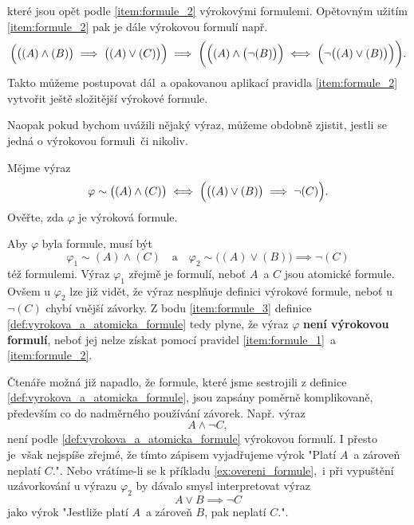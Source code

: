 které jsou opět podle \ref{item:formule_2} výrokovými formulemi. Opětovným užitím \ref{item:formule_2} pak je dále výrokovou formulí např.
\begin{equation*}
    \Bigl(\bigl((A) \land (B)\bigr) \implies \bigl((A) \lor (C)\bigr)\Bigr) \implies \bigg(\Bigl((A) \land \bigl(\neg(B)\bigr)\Bigr) \iff \Bigl(\neg\bigl((A) \lor (B)\bigr)\Bigr)\bigg).
\end{equation*}
Takto můžeme postupovat dál~a opakovanou aplikací pravidla \ref{item:formule_2} vytvořit ještě složitější výrokové formule.\par
Naopak pokud bychom uvážili nějaký výraz, můžeme obdobně zjistit, jestli se jedná o výrokovou formuli~či nikoliv.
\begin{example}\label{ex:overeni_formule}
    Mějme výraz
    \begin{equation*}
        \varphi\sim\bigl((A) \land (C)\bigr) \iff \Bigl(\bigl((A) \lor (B)\bigr) \implies \neg(C)\Bigr).
    \end{equation*}
    Ověřte, zda $\varphi$ je výroková formule.\par
    \begin{solution}
        Aby $\varphi$ byla formule, musí být
        \begin{equation*}
            \varphi_1\sim(A) \land (C)\quad\text{a}\quad\varphi_2\sim\bigl((A) \lor (B)\bigr) \implies \neg(C)
        \end{equation*}
        též formulemi. Výraz $\varphi_1$ zřejmě je formulí, neboť $A$~a $C$ jsou atomické formule. Ovšem u $\varphi_2$ lze již vidět, že výraz nesplňuje definici výrokové formule, neboť u $\neg(C)$ chybí vnější závorky. Z bodu \ref{item:formule_3} definice \ref{def:vyrokova_a_atomicka_formule} tedy plyne, že výraz $\varphi$ \textbf{není výrokovou formulí}, neboť jej nelze získat pomocí pravidel \ref{item:formule_1}~a \ref{item:formule_2}.
    \end{solution}
\end{example}

Čtenáře možná již napadlo, že formule, které jsme sestrojili z definice \ref{def:vyrokova_a_atomicka_formule}, jsou zapsány poměrně komplikovaně, především co do nadměrného používání závorek. Např. výraz
\begin{equation}\label{eq:poradi_operaci}
    A \land \neg C,
\end{equation}
není podle \ref{def:vyrokova_a_atomicka_formule} výrokovou formulí. I přesto je~však nejspíše zřejmé, že tímto zápisem vyjadřujeme výrok "Platí $A$~a zároveň neplatí $C$.". Nebo vrátíme-li se k příkladu \ref{ex:overeni_formule},~i při vypuštění uzávorkování u výrazu $\varphi_2$ by dávalo smysl interpretovat výraz
\begin{equation*}\label{eq:vypusteni_uzavorkovani}
    A \lor B \implies \neg C
\end{equation*}
jako výrok "Jestliže platí $A$~a zároveň $B$, pak neplatí $C$.".